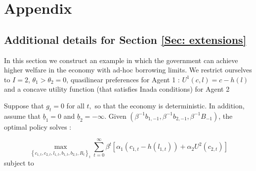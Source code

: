 \documentclass[thmsb,11pt]{article}
\begin{document}
%

\smallskip

\smallskip \pagebreak

\smallskip

\section{Appendix}

\subsection{Additional details for Section \ref{Sec: extensions}}
\label{appndx: borrowing constraints example}
In this section we construct an example in which the government can achieve
higher welfare in the economy with ad-hoc borrowing limits.  We restrict ourselves to $I=2$, $\theta_1>\theta_2=0$, quasilinear preferences for Agent 1 : $U^1(c,l)=c-h(l)$ and a concave utility function (that satisfies Inada conditions) for Agent 2

\smallskip

Suppose that $g_{t}=0$ for all $t,$ so that the economy is deterministic. In addition, assume that $\underline{b}_{1}=0$ and $\underline{b}_{2}=-\infty .$ Given $\left( \beta ^{-1}{b}_{1,-1},\beta ^{-1}{b}%
_{2,-1},\beta ^{-1}{B}_{-1}\right) $, the optimal policy solves :

\begin{equation}
 \label{obj: borrowingconstexample}
 \max_{\left \{ c_{1,t},c_{2,t},l_{1,t},b_{1,t},b_{2,t},R_{t}\right \}
_{t}}\sum_{t=0}^{\infty }\beta ^{t}\left[ \alpha _{1}\left(
c_{1,t}-h(l_{1,t})\right) +\alpha _{2}U^2(c_{2,t})\right]
 \end{equation}
subject to
\end{document}
